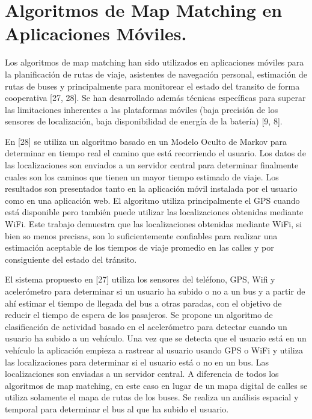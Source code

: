 \documentclass[final,fmstyle]{fpunathesis}
\begin{document}
\section{Algoritmos de Map Matching en Aplicaciones Móviles.}

Los algoritmos de map matching han sido utilizados en aplicaciones móviles para la planificación de rutas de viaje, asistentes de navegación personal, estimación de rutas de buses y principalmente para monitorear el estado del transito de forma cooperativa [27,  28]. Se han desarrollado además técnicas específicas para superar las limitaciones inherentes a las plataformas móviles (baja precisión de los sensores de localización, baja disponibilidad de energía de la batería) [9, 8].

En [28] se utiliza un algoritmo basado en un Modelo Oculto de Markov para determinar en tiempo real el camino que está recorriendo el usuario. Los datos de las localizaciones son enviados a un servidor central para determinar finalmente cuales son los caminos que tienen un mayor tiempo estimado de viaje. Los resultados son presentados tanto en la aplicación móvil instalada por el usuario como en una aplicación web. El algoritmo utiliza principalmente el GPS cuando está disponible pero también puede utilizar las localizaciones obtenidas mediante WiFi. Este trabajo demuestra que las localizaciones obtenidas mediante WiFi, si bien so menos precisas, son lo suficientemente confiables para realizar una estimación aceptable de los tiempos de viaje promedio en las calles y por consiguiente del estado del tránsito.

El sistema propuesto en [27] utiliza los sensores del teléfono, GPS, Wifi y acelerómetro para determinar si un usuario ha subido o no a un bus y a partir de ahí estimar el tiempo de llegada del bus a otras paradas, con el objetivo de reducir el tiempo de espera de los pasajeros. Se propone un algoritmo de clasificación de actividad basado en el acelerómetro para detectar cuando un usuario ha subido a un vehículo. Una vez que se detecta que el usuario está en un vehículo la aplicación empieza a rastrear al usuario usando GPS o WiFi y utiliza las localizaciones para determinar si el usuario está o no en un bus. Las localizaciones son enviadas a un servidor central. A diferencia de todos los algoritmos de map matching, en este caso en lugar de un mapa digital de calles se utiliza solamente el mapa de rutas de los buses. Se realiza un análisis espacial y temporal para determinar el bus al que ha subido el usuario.
\end{document}
